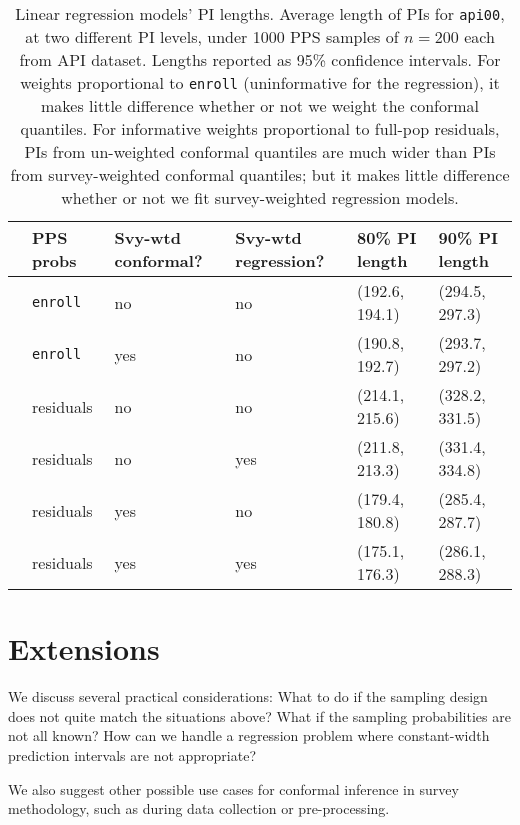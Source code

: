 \documentclass[10.5pt, letterpaper]{article}
\numberwithin{table}{section}
\numberwithin{figure}{section}
\numberwithin{equation}{section}
\begin{document}
\begin{table}[ht!]
\centering
\begin{tabular}{rlllll}
  \hline
  & PPS probs & Svy-wtd conformal? & Svy-wtd regression? & 80\% PI length & 90\% PI length \\
  \hline
  & \texttt{enroll} & no & no & (192.6, 194.1) & (294.5, 297.3) \\
  & \texttt{enroll} & yes & no & (190.8, 192.7) & (293.7, 297.2) \\
  \hline
  & residuals & no & no & (214.1, 215.6) & (328.2, 331.5) \\
  & residuals & no & yes & (211.8, 213.3) & (331.4, 334.8) \\
  & residuals & yes & no & (179.4, 180.8) & (285.4, 287.7) \\
  & residuals & yes & yes & (175.1, 176.3) & (286.1, 288.3) \\
  \hline
\end{tabular}
\caption{Linear regression models' PI lengths. Average length of PIs for \texttt{api00}, at two different PI levels, under 1000 PPS samples of $n=200$ each from API dataset. Lengths reported as 95\% confidence intervals. For weights proportional to \texttt{enroll} (uninformative for the regression), it makes little difference whether or not we weight the conformal quantiles. For informative weights proportional to full-pop residuals, PIs from un-weighted conformal quantiles are much wider than PIs from survey-weighted conformal quantiles; but it makes little difference whether or not we fit survey-weighted regression models.}
\label{table:model_len}
\end{table}





\section{Extensions}\label{sec:Extensions}

We discuss several practical considerations: What to do if the sampling design does not quite match the situations above? What if the sampling probabilities are not all known? How can we handle a regression problem where constant-width prediction intervals are not appropriate?

We also suggest other possible use cases for conformal inference in survey methodology, such as during data collection or pre-processing.
\end{document}
